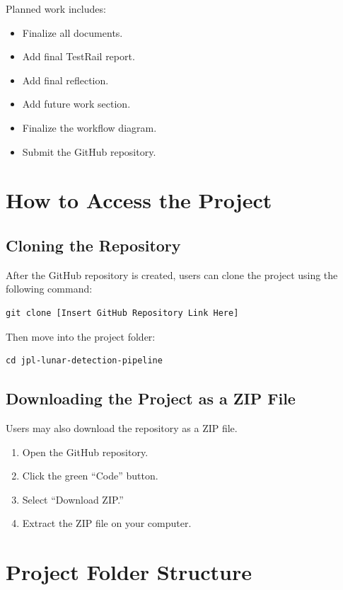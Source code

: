 \documentclass[12pt]{article}
\begin{document}
Planned work includes:

\begin{itemize}
    \item Finalize all documents.
    \item Add final TestRail report.
    \item Add final reflection.
    \item Add future work section.
    \item Finalize the workflow diagram.
    \item Submit the GitHub repository.
\end{itemize}

\section{How to Access the Project}

\subsection{Cloning the Repository}

After the GitHub repository is created, users can clone the project using the following command:

\begin{verbatim}
git clone [Insert GitHub Repository Link Here]
\end{verbatim}

Then move into the project folder:

\begin{verbatim}
cd jpl-lunar-detection-pipeline
\end{verbatim}

\subsection{Downloading the Project as a ZIP File}

Users may also download the repository as a ZIP file.

\begin{enumerate}
    \item Open the GitHub repository.
    \item Click the green ``Code'' button.
    \item Select ``Download ZIP.''
    \item Extract the ZIP file on your computer.
\end{enumerate}

\section{Project Folder Structure}
\end{document}
